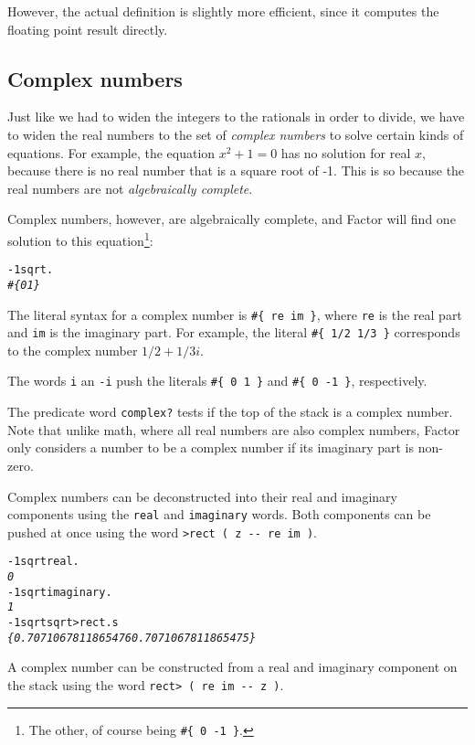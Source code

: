 \documentclass[english]{article}
\begin{document}
However, the actual definition is slightly more efficient, since it computes the floating point result directly.

\subsection{Complex numbers}

Just like we had to widen the integers to the rationals in order to divide, we have to widen the real numbers to the set of \emph{complex numbers} to solve certain kinds of equations. For example, the equation $x^2 + 1 = 0$ has no solution for real $x$, because there is no real number that is a square root of -1. This is so because the real numbers are not \emph{algebraically complete}. 

Complex numbers, however, are algebraically complete, and Factor will find one solution to this equation\footnote{The other, of course being \texttt{\#\{ 0 -1 \}}.}:

\begin{alltt}
-1 sqrt .
\emph{\#\{ 0 1 \}}
\end{alltt}

The literal syntax for a complex number is \texttt{\#\{ re im \}}, where \texttt{re} is the real part and \texttt{im} is the imaginary part. For example, the literal \texttt{\#\{ 1/2 1/3 \}} corresponds to the complex number $1/2 + 1/3i$.

The words \texttt{i} an \texttt{-i} push the literals \texttt{\#\{ 0 1 \}} and \texttt{\#\{ 0 -1 \}}, respectively.

The predicate word \texttt{complex?} tests if the top of the stack is a complex number. Note that unlike math, where all real numbers are also complex numbers, Factor only considers a number to be a complex number if its imaginary part is non-zero.

Complex numbers can be deconstructed into their real and imaginary components using the \texttt{real} and \texttt{imaginary} words. Both components can be pushed at once using the word \texttt{>rect ( z -{}- re im )}.

\begin{alltt}
-1 sqrt real .
\emph{0}
-1 sqrt imaginary .
\emph{1}
-1 sqrt sqrt >rect .s
\emph{\{ 0.7071067811865476 0.7071067811865475 \}}
\end{alltt}

A complex number can be constructed from a real and imaginary component on the stack using the word \texttt{rect> ( re im -{}- z )}.
\end{document}
